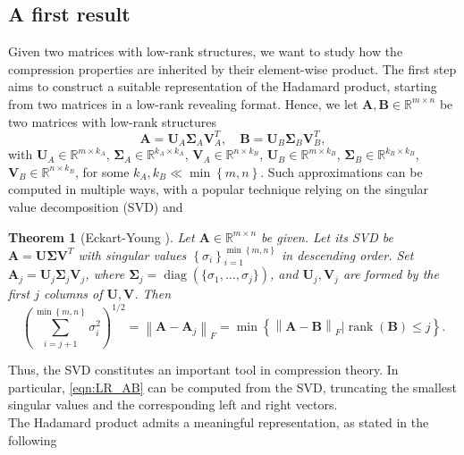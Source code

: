 \documentclass[10pt,titlepage]{article}
\numberwithin{equation}{section}
\numberwithin{figure}{section}
\newtheorem{theorem}{Theorem}
\newcommand{\norm}[1]{\left\lVert#1\right\rVert}
\DeclareMathOperator{\diag}{diag}
\DeclareMathOperator{\rank}{rank}
\begin{document}
\subsection{A first result}
Given two matrices with low-rank structures, we want to study how the compression properties are inherited by their element-wise product. The first step aims to construct a suitable representation of the Hadamard product, starting from two matrices in a low-rank revealing format.
Hence, we let $\mathbf{A},\mathbf{B} \in \mathbb{R}^{m\times n}$ be two matrices with low-rank structures
\begin{equation}
	\mathbf{A}=\mathbf{U}_A\mathbf{\Sigma}_A\mathbf{V}_A^T, \quad \mathbf{B}=\mathbf{U}_B\mathbf{\Sigma}_B\mathbf{V}_B^T,
	\label{eqn:LR_AB}
\end{equation}
with $\mathbf{U}_A \in \mathbb{R}^{m \times k_A}$, $\mathbf{\Sigma}_A \in \mathbb{R}^{k_A \times k_A}$, $\mathbf{V}_A \in \mathbb{R}^{n \times k_B}$, $\mathbf{U}_B \in \mathbb{R}^{m \times k_B}$, $\mathbf{\Sigma}_B \in \mathbb{R}^{k_B \times k_B}$, $\mathbf{V}_B \in \mathbb{R}^{n \times k_B}$, for some $k_A,k_B \ll \min\left\lbrace m,n \right\rbrace$. Such approximations can be computed in multiple ways, with a popular technique relying on the singular value decomposition (SVD) and
\begin{theorem}[Eckart-Young \cite{Simon}]
	Let $\mathbf{A} \in \mathbb{R}^{m \times n}$ be given. Let its SVD be $\mathbf{A}=\mathbf{U} \mathbf{\Sigma} \mathbf{V}^T$ with singular values $\left\lbrace \sigma_i \right\rbrace_{i=1}^{\min\left\lbrace m,n \right\rbrace}$ in descending order. Set $\mathbf{A}_j = \mathbf{U}_j \mathbf{\Sigma}_j \mathbf{V}_j$, where $\mathbf{\Sigma}_j=\diag(\{ \sigma_1,\dots,\sigma_j \}) $, and $\mathbf{U}_j,\mathbf{V}_j$ are formed by the first $j$ columns of $\mathbf{U},\mathbf{V}$. Then
	\begin{equation}
		\left( \sum_{i=j+1}^{\min\left\lbrace m,n \right\rbrace} \sigma_i^2 \right)^{1/2}= \norm{\mathbf{A}-\mathbf{A}_j}_F=
		\min \left\lbrace \norm{\mathbf{A}-\mathbf{B}}_F | \rank(\mathbf{B})\leq j \right\rbrace.
	\end{equation}
	\label{thm:SVD}
\end{theorem}
Thus, the SVD constitutes an important tool in compression theory. In particular, \eqref{eqn:LR_AB} can be computed from the SVD, truncating the smallest singular values and the corresponding left and right vectors. \\
The Hadamard product admits a meaningful representation, as stated in the following
\end{document}

